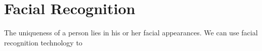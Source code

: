 \section{Facial Recognition}
The uniqueness of a person lies in his or her facial appearances. We can use facial recognition technology
to 
